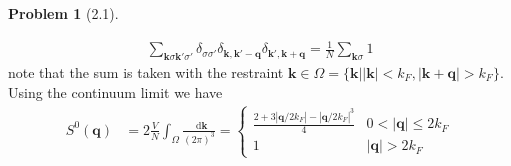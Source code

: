 \documentclass[twoside,11pt]{article}
\renewcommand*\d{\mathop{}\!\mathrm{d}}
\theoremstyle{definition}
\newtheorem{problem}{Problem}
\theoremstyle{remark}
\begin{document}
\begin{problem}[2.1]
\begin{enumerate}[label=(\alph*)]
\begin{align*}
    \sum_{\mathbf{k}\sigma\mathbf{k}'\sigma'}
    \delta_{\sigma\sigma'}\delta_{\mathbf{k},\mathbf{k}'-\mathbf{q}}
    \delta_{\mathbf{k}',\mathbf{k}+\mathbf{q}}
    =
    \frac{1}{N}
    \sum_{\mathbf{k}\sigma} 1
\end{align*}
note that the sum is taken with the restraint
$\mathbf{k}\in\Omega = \{\mathbf{k}||\mathbf{k}|<k_F, |\mathbf{k}+\mathbf{q}|>k_F\}$.
Using the continuum limit we have
\begin{align*}
    S^0(\mathbf{q}) &= 
    2\frac{V}{N}\int_\Omega \frac{\d\mathbf{k}}{(2\pi)^3}
    = \begin{cases}
        \frac{2+3|\mathbf{q}/2k_F|-|\mathbf{q}/2k_F|^3}{4} & 0 < |\mathbf{q}| \leq 2k_F\\
        1 & |\mathbf{q}| > 2k_F
    \end{cases}
\end{align*}

\end{enumerate}
\end{problem}
\end{document}

